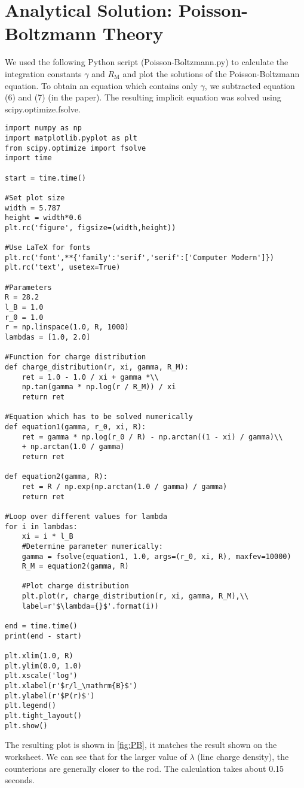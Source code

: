 \documentclass[a4paper,10pt,bibtotoc]{scrartcl}
\begin{document}
\section{Analytical Solution: Poisson-Boltzmann Theory}
We used the following Python script (Poisson-Boltzmann.py) to calculate the integration constants $\gamma$ and $R_\mathrm{M}$ and plot the solutions of the Poisson-Boltzmann equation. To obtain an equation which contains only $\gamma$, we subtracted equation (6) and (7) (in the paper). The resulting implicit equation was solved using scipy.optimize.fsolve.
\begin{lstlisting}
import numpy as np
import matplotlib.pyplot as plt
from scipy.optimize import fsolve
import time

start = time.time()

#Set plot size
width = 5.787
height = width*0.6
plt.rc('figure', figsize=(width,height))

#Use LaTeX for fonts
plt.rc('font',**{'family':'serif','serif':['Computer Modern']})
plt.rc('text', usetex=True)

#Parameters
R = 28.2
l_B = 1.0
r_0 = 1.0
r = np.linspace(1.0, R, 1000)
lambdas = [1.0, 2.0]

#Function for charge distribution
def charge_distribution(r, xi, gamma, R_M):
    ret = 1.0 - 1.0 / xi + gamma *\\
    np.tan(gamma * np.log(r / R_M)) / xi
    return ret

#Equation which has to be solved numerically
def equation1(gamma, r_0, xi, R):
    ret = gamma * np.log(r_0 / R) - np.arctan((1 - xi) / gamma)\\
    + np.arctan(1.0 / gamma)
    return ret

def equation2(gamma, R):
    ret = R / np.exp(np.arctan(1.0 / gamma) / gamma)
    return ret

#Loop over different values for lambda
for i in lambdas:
    xi = i * l_B
    #Determine parameter numerically:
    gamma = fsolve(equation1, 1.0, args=(r_0, xi, R), maxfev=10000)
    R_M = equation2(gamma, R)
    
    #Plot charge distribution
    plt.plot(r, charge_distribution(r, xi, gamma, R_M),\\
    label=r'$\lambda={}$'.format(i))
    
end = time.time()
print(end - start)

plt.xlim(1.0, R)
plt.ylim(0.0, 1.0)
plt.xscale('log')
plt.xlabel(r'$r/l_\mathrm{B}$')
plt.ylabel(r'$P(r)$')
plt.legend()
plt.tight_layout()
plt.show()
\end{lstlisting}
The resulting plot is shown in \autoref{fig:PB}, it matches the result shown on the worksheet. We can see that for the larger value of $\lambda$ (line charge density), the counterions are generally closer to the rod. The calculation takes about 0.15 seconds.
\end{document}
